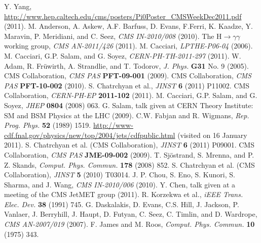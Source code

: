 \documentclass[12pt, letterpaper]{report}
\begin{document}
\begin{thebibliography}{99}
 Y. Yang, \url{http://www.hep.caltech.edu/cms/posters/Pi0Poster_CMSWeekDec2011.pdf} (2011).
 M. Anderson, A. Askew, A.F. Barfuss, D. Evans, F.Ferri, K. Kaadze, Y. 
Maravin, P. Meridiani, and C. Seez, \textit{CMS IN-2010/008} (2010).
 The H$\rightarrow\gamma\gamma$ working group, \textit{CMS AN-2011/426} (2011).
 M. Cacciari, \textit{LPTHE-P06-04} (2006).
 M. Cacciari, G.P. Salam, and G. Soyez, \textit{CERN-PH-TH-2011-297} (2011).
 W. Adam, R. Fr\"uwirth, A. Strandlie, and T. Todorov, \textit{J. Phys.} \textbf{G31} No. 9 (2005).
 CMS Collaboration, \textit{CMS PAS} \textbf{PFT-09-001} (2009).
 CMS Collaboration, \textit{CMS PAS} \textbf{PFT-10-002} (2010).
 S. Chatrchyan et al., \textit{JINST} \textbf{6} (2011) P11002.
 CMS Collaboration, \textit{CERN-PH-EP} \textbf{2011-102} (2011).
 M. Cacciari, G.P. Salam, and G. Soyez, \textit{JHEP} \textbf{0804} (2008) 063.
 G. Salam, talk given at CERN Theory Institute: SM and BSM Physics at the LHC (2009).
 C.W. Fabjan and R. Wigmans, \textit{Rep. Prog. Phys.} \textbf{52} (1989) 1519.
 \url{http://www-cdf.fnal.gov/physics/new/top/2004/jets/cdfpublic.html} (visited on 16 January 2011).
 S. Chatrchyan et al. (CMS Collaboration), \textit{JINST} \textbf{6} (2011) P09001.
 CMS Collaboration, \textit{CMS PAS} \textbf{JME-09-002} (2009).
 T. Sj\"ostrand, S. Mrenna, and P. Z. Skands, \textit{Comput. Phys. Commun.} \textbf{178} (2008) 852.
 S. Chatrchyan et al. (CMS Collaboration), \textit{JINST} \textbf{5} (2010) T03014.
 J. P. Chou, S. Eno, S. Kunori, S. Sharma, and J. Wang, \textit{CMS IN-2010/006} (2010).
 Y. Chen, talk given at a meeting of the CMS JetMET group (2011).
 R. Korzekwa et al., \textit{iEEE Trans. Elec. Dev.} \textbf{38} (1991) 745.
 G. Daskalakis, D. Evans, C.S. Hill, J. Jackson, P. Vanlaer, J. Berryhill, J. Haupt, D. Futyan, C. Seez, C. Timlin, and D. Wardrope, \textit{CMS AN-2007/019} (2007).
 F. James and M. Roos, \textit{Comput. Phys. Commun.} \textbf{10} (1975) 343.

\end{thebibliography}
\end{document}
